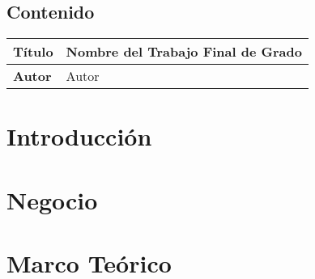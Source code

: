 \documentclass{scrreprt}
\begin{document}
\section*{Contenido}
\renewcommand{\contentsname}{}
\setcounter{tocdepth}{0}
\makeatletter
\renewcommand*{\tableofcontents}{%
}
\makeatother

\tableofcontents

\par

\begin{tabular}{ll}
  \toprule
  \textbf{Título} & Nombre del Trabajo Final de Grado \\
  \midrule
  \textbf{Autor} & Autor \\
  \bottomrule
\end{tabular}

\chapter{Introducción}
\chapter{Negocio}
\chapter{Marco Teórico}
\end{document}

